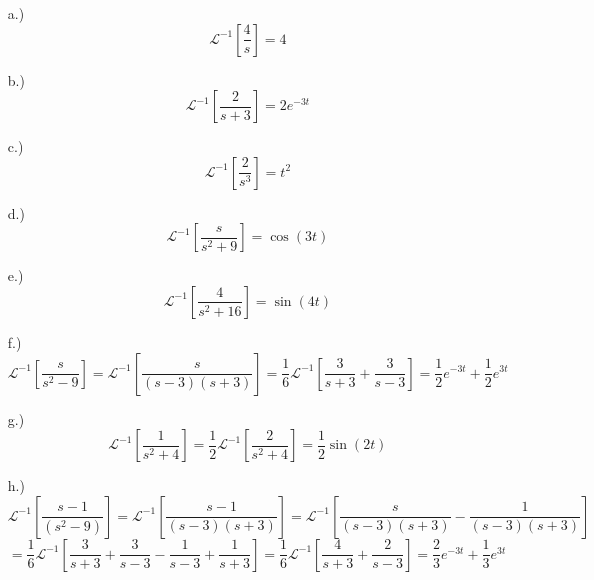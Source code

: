 \documentclass[12pt]{article}
\newcommand{\bracks}[1]{\left[#1\right]}
\newcommand{\lpi}{\mathcal{L}^{-1}}
\begin{document}
\pagestyle{fancy}
\fancyhead{}

\normalsize
\begin{itemize}
    \item [a.)] \[\lpi\bracks{\frac{4}{s}}=4\]

    \item [b.)] \[\lpi\bracks{\frac{2}{s+3}}=2e^{-3t}\]

    \item [c.)] \[\lpi\bracks{\frac{2}{s^3}}=t^2\]

    \item [d.)] \[\lpi\bracks{\frac{s}{s^2+9}}=\cos(3t)\]

    \item [e.)] \[\lpi\bracks{\frac{4}{s^2+16}}=\sin(4t)\]

    \item [f.)] \[\lpi\bracks{\frac{s}{s^2-9}}=\lpi\bracks{\frac{s}{(s-3)(s+3)}}=\frac{1}{6}\lpi\bracks{\frac{3}{s+3}+\frac{3}{s-3}}=\frac{1}{2}e^{-3t}+\frac{1}{2}e^{3t}\]

    \item [g.)] \[\lpi\bracks{\frac{1}{s^2+4}}=\frac{1}{2}\lpi\bracks{\frac{2}{s^2+4}}=\frac{1}{2}\sin(2t)\]

    \item [h.)] \[\lpi\bracks{\frac{s-1}{(s^2-9)}}=\lpi\bracks{\frac{s-1}{(s-3)(s+3)}}=\lpi\bracks{\frac{s}{(s-3)(s+3)}-\frac{1}{(s-3)(s+3)}}\]
    \[=\frac{1}{6}\lpi\bracks{\frac{3}{s+3}+\frac{3}{s-3}-\frac{1}{s-3}+\frac{1}{s+3}}=\frac{1}{6}\lpi\bracks{\frac{4}{s+3}+\frac{2}{s-3}}=\frac{2}{3}e^{-3t}+\frac{1}{3}e^{3t}\]

\end{itemize}
\end{document}

